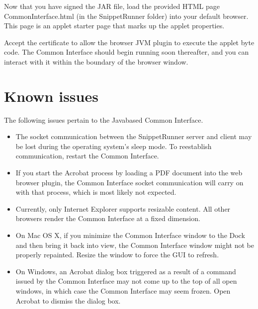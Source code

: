 \documentclass[letterpaper,12pt,english,openany,oneside]{sphinxmanual}
\begin{document}
Now that you have signed the JAR file, load the provided HTML page CommonInterface.html (in the SnippetRunner folder) into your default browser. This page is an applet starter page that marks up the applet properties.

Accept the certificate to allow the browser JVM plug\sphinxhyphen{}in to execute the applet byte code. The Common Interface should begin running soon thereafter, and you can interact with it within the boundary of the browser window.


\section{Known issues}
\label{\detokenize{Snippet_SnippetRunnerCookbook:known-issues}}
The following issues pertain to the Java\sphinxhyphen{}based Common Interface.
\begin{itemize}
\item {} 
The socket communication between the SnippetRunner server and client may be lost during the operating system’s sleep mode. To re\sphinxhyphen{}establish communication, restart the Common Interface.

\item {} 
If you start the Acrobat process by loading a PDF document into the web browser plug\sphinxhyphen{}in, the Common Interface socket communication will carry on with that process, which is most likely not expected.

\item {} 
Currently, only Internet Explorer supports resizable content. All other browsers render the Common Interface at a fixed dimension.

\item {} 
On Mac OS X, if you minimize the Common Interface window to the Dock and then bring it back into view, the Common Interface window might not be properly repainted. Resize the window to force the GUI to refresh.

\item {} 
On Windows, an Acrobat dialog box triggered as a result of a command issued by the Common Interface may not come up to the top of all open windows, in which case the Common Interface may seem frozen. Open Acrobat to dismiss the dialog box.

\end{itemize}
\end{document}
